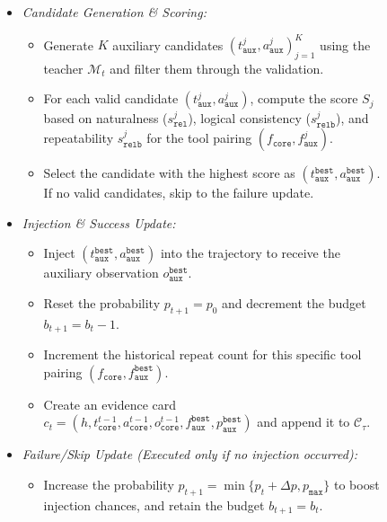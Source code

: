 \begin{figure}[!t]
\begin{itemize}
    \item \textit{Candidate Generation \& Scoring:}
\begin{itemize}
        \item Generate $K$ auxiliary candidates $(t_{\mathtt{aux}}^j, a_{\mathtt{aux}}^j)_{j=1}^K$ using the teacher $\mathcal{M}_t$ and filter them through the validation.
        \item For each valid candidate $(t_{\mathtt{aux}}^j, a_{\mathtt{aux}}^j)$, compute the score $S_j$ based on naturalness ($s_{\mathtt{rel}}^j$), logical consistency ($s_{\mathtt{relb}}^j$), and repeatability $s_{\mathtt{relb}}^j$ for the tool pairing $(f_{\mathtt{core}}, f_{\mathtt{aux}}^j)$.
        \item Select the candidate with the highest score as $(t_{\mathtt{aux}}^{\mathtt{best}}, a_{\mathtt{aux}}^{\mathtt{best}})$. If no valid candidates, skip to the failure update.
    \end{itemize}

    \item \textit{Injection \& Success Update:}
\begin{itemize}
        \item Inject $(t_{\mathtt{aux}}^{\mathtt{best}}, a_{\mathtt{aux}}^{\mathtt{best}})$ into the trajectory to receive the auxiliary observation $o_{\mathtt{aux}}^{\mathtt{best}}$.
        \item Reset the probability $p_{t+1} = p_0$ and decrement the budget $b_{t+1} = b_t - 1$.
        \item Increment the historical repeat count for this specific tool pairing $(f_{\mathtt{core}}, f_{\mathtt{aux}}^{\mathtt{best}})$.
        \item Create an evidence card $c_t = (h, t_{\mathtt{core}}^{t-1}, a_{\mathtt{core}}^{t-1}, o_{\mathtt{core}}^{t-1}, f_{\mathtt{aux}}^{\mathtt{best}}, p_{\mathtt{aux}}^{\mathtt{best}})$ and append it to $\mathcal{C}_\tau$.
    \end{itemize}

    \item \textit{Failure/Skip Update (Executed only if no injection occurred):}
\begin{itemize}
        \item Increase the probability $p_{t+1} = \min\{p_t + \Delta p, p_{\mathtt{max}}\}$ to boost injection chances, and retain the budget $b_{t+1} = b_t$.
    \end{itemize}
\end{itemize}


\end{figure}
